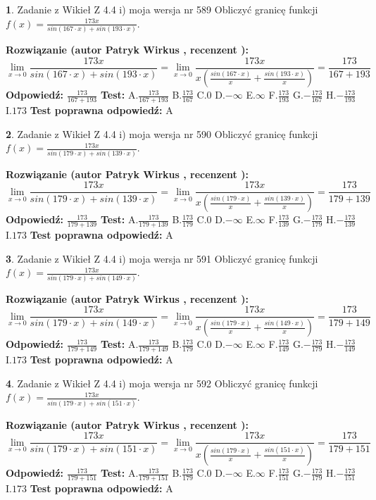 \documentclass[12pt, a4paper]{article}
\theoremstyle{definition} %
\newtheorem{zad}{}
\newcommand{\zadStart}[1]{\begin{zad}#1\newline}
\newcommand{\zadStop}{\end{zad}}
\newcommand{\rozwStart}[2]{\noindent \textbf{Rozwiązanie (autor #1 , recenzent #2): }\newline}
\newcommand{\rozwStop}{\newline}
\newcommand{\odpStart}{\noindent \textbf{Odpowiedź:}\newline}
\newcommand{\odpStop}{\newline}
\newcommand{\testStart}{\noindent \textbf{Test:}\newline}
\newcommand{\testStop}{\newline}
\newcommand{\kluczStart}{\noindent \textbf{Test poprawna odpowiedź:}\newline}
\newcommand{\kluczStop}{\newline}
\begin{document}
\zadStart{Zadanie z Wikieł Z 4.4 i) moja wersja nr 589}
Obliczyć granicę funkcji $f(x)=\frac{173x}{sin(167\cdot x) +sin(193\cdot x)}$.
\zadStop
\rozwStart{Patryk Wirkus}{}
$$\lim\limits_{x\to 0}\frac{173x}{sin(167\cdot x) +sin(193\cdot x)}=\lim\limits_{x\to 0}\frac{173x}{x(\frac{sin(167\cdot x)}{x}+\frac{sin(193\cdot x)}{x})}=\frac{173}{167+193}$$
\rozwStop
\odpStart
$\frac{173}{167+193}$
\odpStop
\testStart
A.$\frac{173}{167+193}$
B.$\frac{173}{167}$
C.$0$
D.$-\infty$
E.$\infty$
F.$\frac{173}{193}$
G.$-\frac{173}{167}$
H.$-\frac{173}{193}$
I.$173$
\testStop
\kluczStart
A
\kluczStop



\zadStart{Zadanie z Wikieł Z 4.4 i) moja wersja nr 590}
Obliczyć granicę funkcji $f(x)=\frac{173x}{sin(179\cdot x) +sin(139\cdot x)}$.
\zadStop
\rozwStart{Patryk Wirkus}{}
$$\lim\limits_{x\to 0}\frac{173x}{sin(179\cdot x) +sin(139\cdot x)}=\lim\limits_{x\to 0}\frac{173x}{x(\frac{sin(179\cdot x)}{x}+\frac{sin(139\cdot x)}{x})}=\frac{173}{179+139}$$
\rozwStop
\odpStart
$\frac{173}{179+139}$
\odpStop
\testStart
A.$\frac{173}{179+139}$
B.$\frac{173}{179}$
C.$0$
D.$-\infty$
E.$\infty$
F.$\frac{173}{139}$
G.$-\frac{173}{179}$
H.$-\frac{173}{139}$
I.$173$
\testStop
\kluczStart
A
\kluczStop



\zadStart{Zadanie z Wikieł Z 4.4 i) moja wersja nr 591}
Obliczyć granicę funkcji $f(x)=\frac{173x}{sin(179\cdot x) +sin(149\cdot x)}$.
\zadStop
\rozwStart{Patryk Wirkus}{}
$$\lim\limits_{x\to 0}\frac{173x}{sin(179\cdot x) +sin(149\cdot x)}=\lim\limits_{x\to 0}\frac{173x}{x(\frac{sin(179\cdot x)}{x}+\frac{sin(149\cdot x)}{x})}=\frac{173}{179+149}$$
\rozwStop
\odpStart
$\frac{173}{179+149}$
\odpStop
\testStart
A.$\frac{173}{179+149}$
B.$\frac{173}{179}$
C.$0$
D.$-\infty$
E.$\infty$
F.$\frac{173}{149}$
G.$-\frac{173}{179}$
H.$-\frac{173}{149}$
I.$173$
\testStop
\kluczStart
A
\kluczStop



\zadStart{Zadanie z Wikieł Z 4.4 i) moja wersja nr 592}
Obliczyć granicę funkcji $f(x)=\frac{173x}{sin(179\cdot x) +sin(151\cdot x)}$.
\zadStop
\rozwStart{Patryk Wirkus}{}
$$\lim\limits_{x\to 0}\frac{173x}{sin(179\cdot x) +sin(151\cdot x)}=\lim\limits_{x\to 0}\frac{173x}{x(\frac{sin(179\cdot x)}{x}+\frac{sin(151\cdot x)}{x})}=\frac{173}{179+151}$$
\rozwStop
\odpStart
$\frac{173}{179+151}$
\odpStop
\testStart
A.$\frac{173}{179+151}$
B.$\frac{173}{179}$
C.$0$
D.$-\infty$
E.$\infty$
F.$\frac{173}{151}$
G.$-\frac{173}{179}$
H.$-\frac{173}{151}$
I.$173$
\testStop
\kluczStart
A
\kluczStop
\end{document}
